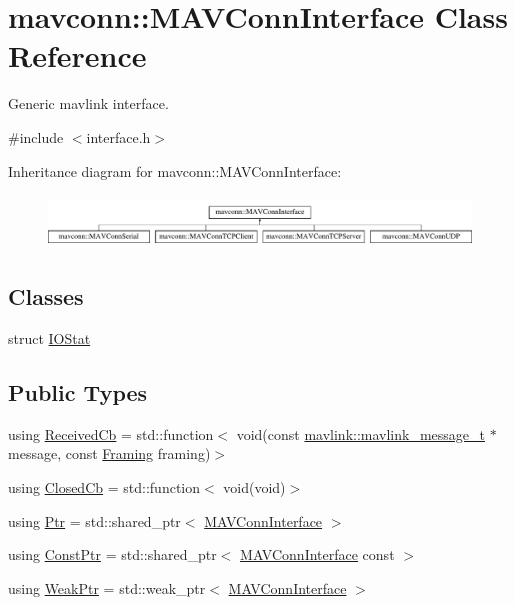 \hypertarget{classmavconn_1_1MAVConnInterface}{}\section{mavconn\+::M\+A\+V\+Conn\+Interface Class Reference}
\label{classmavconn_1_1MAVConnInterface}


Generic mavlink interface.  




{\ttfamily \#include $<$interface.\+h$>$}

Inheritance diagram for mavconn\+::M\+A\+V\+Conn\+Interface\+:\begin{figure}[H]
\begin{center}
\leavevmode
\includegraphics[height=1.407035cm]{classmavconn_1_1MAVConnInterface}
\end{center}
\end{figure}
\subsection*{Classes}
\begin{DoxyCompactItemize}
\item 
struct \mbox{\hyperlink{structmavconn_1_1MAVConnInterface_1_1IOStat}{I\+O\+Stat}}
\end{DoxyCompactItemize}
\subsection*{Public Types}
\begin{DoxyCompactItemize}
\item 
using \mbox{\hyperlink{group__mavconn_ga1d04ead963f1685f3aaf4b18ffb49ff7}{Received\+Cb}} = std\+::function$<$ void(const \mbox{\hyperlink{include__v0_89_2mavlink__types_8h_a63b963764c09dc72f4910c1521e325b9}{mavlink\+::mavlink\+\_\+message\+\_\+t}} $\ast$message, const \mbox{\hyperlink{group__mavconn_gac93e6f8262bcc6008b4882ae6213f494}{Framing}} framing)$>$
\item 
using \mbox{\hyperlink{group__mavconn_ga6eef19e745c84f9b0b85d704b2e3e430}{Closed\+Cb}} = std\+::function$<$ void(void)$>$
\item 
using \mbox{\hyperlink{group__mavconn_gaff41078b805e1d8f85ed6fd2d87711ce}{Ptr}} = std\+::shared\+\_\+ptr$<$ \mbox{\hyperlink{classmavconn_1_1MAVConnInterface}{M\+A\+V\+Conn\+Interface}} $>$
\item 
using \mbox{\hyperlink{group__mavconn_ga47036145ce30f67fcd830e28712216eb}{Const\+Ptr}} = std\+::shared\+\_\+ptr$<$ \mbox{\hyperlink{classmavconn_1_1MAVConnInterface}{M\+A\+V\+Conn\+Interface}} const  $>$
\item 
using \mbox{\hyperlink{group__mavconn_ga010ca3b237199e0ebb7b850b1f3ea0ba}{Weak\+Ptr}} = std\+::weak\+\_\+ptr$<$ \mbox{\hyperlink{classmavconn_1_1MAVConnInterface}{M\+A\+V\+Conn\+Interface}} $>$
\end{DoxyCompactItemize}
